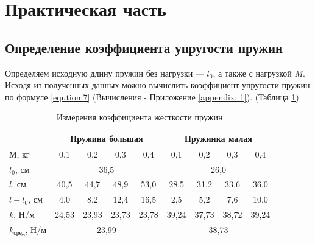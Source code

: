 \section{Практическая часть}

\setcounter{table}{0}

\subsection{Определение коэффициента упругости пружин}

Определяем исходную длину пружин без нагрузки — $l_0$, а также с нагрузкой $M$. Исходя из полученных данных можно вычислить коэффициент упругости пружин по формуле \ref{eqution:7} (Вычисления - Приложение \ref{appendix: 1}). (Таблица \ref{tabular:measuring_1})
\begin{table}[htbp]
	\caption{Измерения коэффициента жесткости пружин}
	\centering
	\label{tabular:measuring_1}
	\begin{tabular}{|l|c|c|c|c|c|c|c|c|}
		\hline
		                       & \multicolumn{4}{c|}{Пружина большая} & \multicolumn{4}{c|}{Пружинка малая} \\ \hline
		М, кг                  &  0,1  &  0,2  &  0,3  &     0,4      &  0,1  &  0,2  &  0,3  &     0,4     \\ \hline
		$l_0$, см              &      \multicolumn{4}{c|}{36,5}       &      \multicolumn{4}{c|}{26,0}      \\ \hline
		$l$, см                & 40,5  & 44,7  & 48,9  &     53,0     & 28,5  & 31,2  & 33,6  &    36,0     \\ \hline
		$l-l_0$, см            &  4,0  &  8,2  & 12,4  &     16,5     &  2,5  &  5,2  &  7,6  &    10,0     \\ \hline
		$k$, Н/м               & 24,53 & 23,93 & 23,73 &    23,78     & 39,24 & 37,73 & 38,72 &    39,24    \\ \hline
		$k_{\text{сред}}$, Н/м &      \multicolumn{4}{c|}{23,99}      &     \multicolumn{4}{c|}{38,73}      \\ \hline
	\end{tabular}
\end{table}


